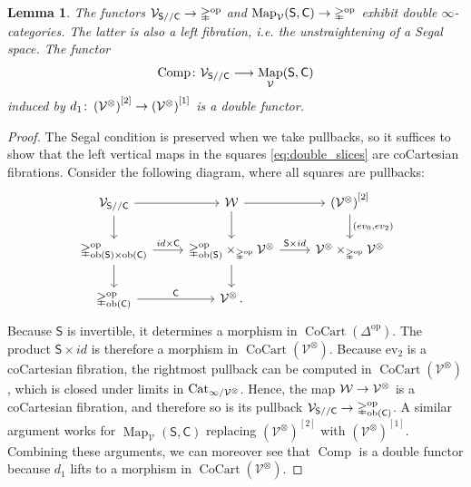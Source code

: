 \documentclass[10pt]{amsart}
\numberwithin{equation}{section}
\newtheorem{lem}[prop]{Lemma}
\theoremstyle{definition}
\DeclareMathOperator{\Map}{Map}
\DeclareMathOperator{\ob}{ob}
\DeclareMathOperator{\op}{op}
\DeclareMathOperator{\CoCart}{CoCart}
\DeclareMathOperator{\Comp}{Comp}
\newcommand{\Cat}{\mathrm{Cat}\vphantom{t}}
\newcommand{\Simp}{\mathbb{\Delta}}
\newcommand{\cV}{\mathcal{V}}
\newcommand{\cW}{\mathcal{W}}
\newcommand{\sfC}{\mathsf{C}}
\newcommand{\sfS}{\mathsf{S}}
\renewcommand{\to}{\mathchoice{\longrightarrow}{\rightarrow}{}{}}
\begin{document}
	\begin{lem}\label{lem:double_slices}
		The functors $\cV_{\sfS / / \sfC}\to \Simp^{\op}$ and $\Map_{\cV}(\sfS,\sfC) \to \Simp^{\op}$ exhibit double $\infty$-categories.
		The latter is also a left fibration, i.e. the unstraightening of a Segal space.
		The functor
		\begin{align*}
			\Comp\colon \cV_{\sfS / / \sfC} \to \Map_{\cV}(\sfS, \sfC)
		\end{align*}
		induced by $d_1\colon \left(\cV^{\otimes} \right)^{[2]} \to \left(\cV^{\otimes} \right)^{[1]}$ is a double functor.
	\end{lem}
	\begin{proof}
		The Segal condition is preserved when we take pullbacks, so it suffices to show that the left vertical maps in the squares \eqref{eq:double_slices} are coCartesian fibrations.
		Consider the following diagram, where all squares are pullbacks:
		\begin{equation}\label{eq:V_S//C-diagram}
			\begin{tikzcd}
				\cV_{\sfS/ /\sfC} \arrow[r] \arrow[d] &
				\cW \arrow[r] \arrow[d] &
				\left(\cV^{\otimes} \right)^{[2]} \arrow[d, "(ev_0 {, } ev_{2})" ]\\
				\Simp^{\op}_{\ob(\sfS)\times \ob(\sfC)}
				\arrow[r, "id\times \sfC"] \arrow[d] &
				\Simp^{\op}_{\ob(\sfS)} \times_{\Simp^{\op}} \cV^{\otimes}
				\arrow[r, "\sfS \times id"] \arrow[d] &
				\cV^{\otimes} \times_{\Simp^{\op}} \cV^{\otimes}\\
				\Simp^{\op}_{\ob(\sfC)} \arrow[r, "\sfC"] &
				\cV^{\otimes} \,. &
			\end{tikzcd}
		\end{equation}
		Because $\sfS$ is invertible, it determines a morphism in $\CoCart(\Simp^{\op})$. The product $\sfS\times id$ is therefore a morphism in $\CoCart(\cV^{\otimes})$. Because $\mathrm{ev}_2$ is a coCartesian fibration, the rightmost pullback can be computed in $\CoCart(\cV^{\otimes})$, which is closed under limits in $\Cat_{\infty /\cV^{\otimes}}$.
		Hence, the map $\cW \to \cV^{\otimes}$ is a coCartesian fibration, and therefore so is its pullback $\cV_{\sfS //\sfC} \to \Simp^{\op}_{\ob(\sfC)}$.
		A similar argument works for $\Map_{\cV}(\sfS, \sfC)$ replacing $\left(\cV^{\otimes} \right)^{[2]}$ with $\left(\cV^{\otimes} \right)^{[1]}$. Combining these arguments, we can moreover see that $\Comp$ is a double functor because $d_1$ lifts to a morphism in $\CoCart(\cV^{\otimes})$.
	\end{proof}
\end{document}
